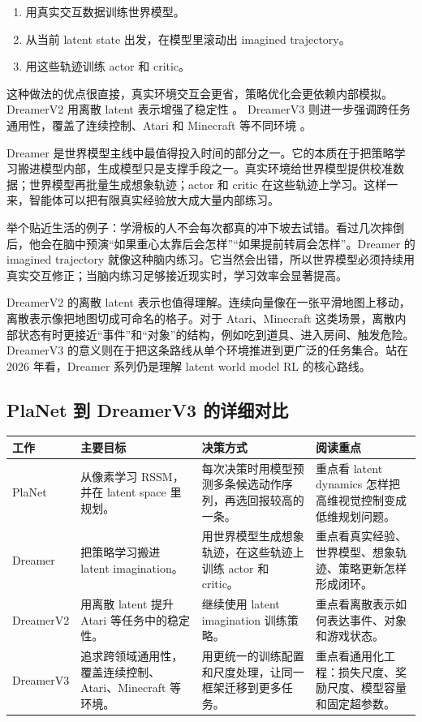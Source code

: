 \documentclass[11pt,a4paper]{ctexart}
\begin{document}
\begin{enumerate}
  \item 用真实交互数据训练世界模型。
  \item 从当前 latent state 出发，在模型里滚动出 imagined trajectory。
  \item 用这些轨迹训练 actor 和 critic。
\end{enumerate}

这种做法的优点很直接，真实环境交互会更省，策略优化会更依赖内部模拟。
DreamerV2 用离散 latent 表示增强了稳定性 \cite{hafner2021dreamerv2}。
DreamerV3 则进一步强调跨任务通用性，覆盖了连续控制、Atari 和 Minecraft 等不同环境 \cite{hafner2023dreamerv3}。

Dreamer 是世界模型主线中最值得投入时间的部分之一。它的本质在于把策略学习搬进模型内部，生成模型只是支撑手段之一。真实环境给世界模型提供校准数据；世界模型再批量生成想象轨迹；actor 和 critic 在这些轨迹上学习。这样一来，智能体可以把有限真实经验放大成大量内部练习。

举个贴近生活的例子：学滑板的人不会每次都真的冲下坡去试错。看过几次摔倒后，他会在脑中预演“如果重心太靠后会怎样”“如果提前转肩会怎样”。Dreamer 的 imagined trajectory 就像这种脑内练习。它当然会出错，所以世界模型必须持续用真实交互修正；当脑内练习足够接近现实时，学习效率会显著提高。

DreamerV2 的离散 latent 表示也值得理解。连续向量像在一张平滑地图上移动，离散表示像把地图切成可命名的格子。对于 Atari、Minecraft 这类场景，离散内部状态有时更接近“事件”和“对象”的结构，例如吃到道具、进入房间、触发危险。DreamerV3 的意义则在于把这条路线从单个环境推进到更广泛的任务集合。站在 2026 年看，Dreamer 系列仍是理解 latent world model RL 的核心路线。

\subsection{PlaNet 到 DreamerV3 的详细对比}

\begin{longtable}{p{} p{} p{} p{}}
\toprule
工作 & 主要目标 & 决策方式 & 阅读重点 \\
\midrule
PlaNet & 从像素学习 RSSM，并在 latent space 里规划。 & 每次决策时用模型预测多条候选动作序列，再选回报较高的一条。 & 重点看 latent dynamics 怎样把高维视觉控制变成低维规划问题。 \\
Dreamer & 把策略学习搬进 latent imagination。 & 用世界模型生成想象轨迹，在这些轨迹上训练 actor 和 critic。 & 重点看真实经验、世界模型、想象轨迹、策略更新怎样形成闭环。 \\
DreamerV2 & 用离散 latent 提升 Atari 等任务中的稳定性。 & 继续使用 latent imagination 训练策略。 & 重点看离散表示如何表达事件、对象和游戏状态。 \\
DreamerV3 & 追求跨领域通用性，覆盖连续控制、Atari、Minecraft 等环境。 & 用更统一的训练配置和尺度处理，让同一框架迁移到更多任务。 & 重点看通用化工程：损失尺度、奖励尺度、模型容量和固定超参数。 \\
\bottomrule
\end{longtable}
\end{document}
